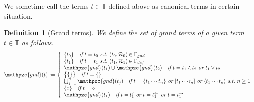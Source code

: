 \documentclass[12pt]{article}
\newtheorem{Definition}{Definition}[section]
\begin{document}
We sometime call the terms $t \in \mathbb{T}$ defined above as canonical
terms in certain situation.


\begin{Definition}[Grand terms]
  We define the set of grand terms of a given term $t \in \mathbb{T}$ as
  follows.
  \begin{displaymath}
    \mathpzc{gnd}(t) := \left\{\begin{array}{l}
      \{t_0\} \quad \text{\it if}\ t = t_0\
       \text{\it s.t.}\ (t_0,\mathcal{R}_0) \in \Gamma_{gnd}  \\
      \{t_1\} \quad \text{\it if}\ t = t_1\
       \text{\it s.t.}\ (t_1,\mathcal{R}_1) \in \Gamma_{def}  \\
      \mathpzc{gnd}(t_1) \cup \mathpzc{gnd}(t_2) \quad \text{\it if}\ t = t_1
       \wedge t_2\ \text{\it or}\ t_1 \vee t_2  \\
      \bigl\{ \{\} \bigr\} \quad \text{\it if}\ t = \{\}  \\
       \bigcup_{j=1}^{n}\mathpzc{gnd}(t_j) \quad \text{\it if}\
      t = \{t_1 \cdots t_n\}\ \text{\it or}\ [t_1 \cdots t_n]\ \text{\it or}\
       \langle t_1 \cdots t_n \rangle\ \text{\it s.t.}\ n \ge 1  \\
      \{\circ\} \quad \text{\it if}\ t = \circ  \\
       \mathpzc{gnd}(t_1) \quad \text{\it if}\ t = t_1^?\ \text{\it or}\
      t = t_1^{\leftarrow}\ \text{\it or}\ t = t_1^{\rightarrow}
    \end{array}\right.
  \end{displaymath}
\end{Definition}
\end{document}
